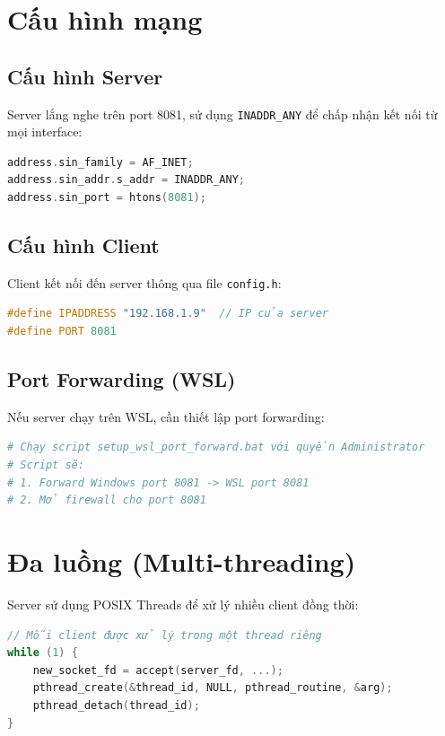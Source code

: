 \documentclass[12pt,a4paper]{report}
\begin{document}
\section{Cấu hình mạng}

\subsection{Cấu hình Server}

Server lắng nghe trên port 8081, sử dụng \texttt{INADDR\_ANY} để chấp nhận kết nối từ mọi interface:

\begin{lstlisting}[language=C]
address.sin_family = AF_INET;
address.sin_addr.s_addr = INADDR_ANY;
address.sin_port = htons(8081);
\end{lstlisting}

\subsection{Cấu hình Client}

Client kết nối đến server thông qua file \texttt{config.h}:

\begin{lstlisting}[language=C++]
#define IPADDRESS "192.168.1.9"  // IP của server
#define PORT 8081
\end{lstlisting}

\subsection{Port Forwarding (WSL)}

Nếu server chạy trên WSL, cần thiết lập port forwarding:

\begin{lstlisting}[language=bash]
# Chạy script setup_wsl_port_forward.bat với quyền Administrator
# Script sẽ:
# 1. Forward Windows port 8081 -> WSL port 8081
# 2. Mở firewall cho port 8081
\end{lstlisting}

\section{Đa luồng (Multi-threading)}

Server sử dụng POSIX Threads để xử lý nhiều client đồng thời:

\begin{lstlisting}[language=C]
// Mỗi client được xử lý trong một thread riêng
while (1) {
    new_socket_fd = accept(server_fd, ...);
    pthread_create(&thread_id, NULL, pthread_routine, &arg);
    pthread_detach(thread_id);
}
\end{lstlisting}
\end{document}
